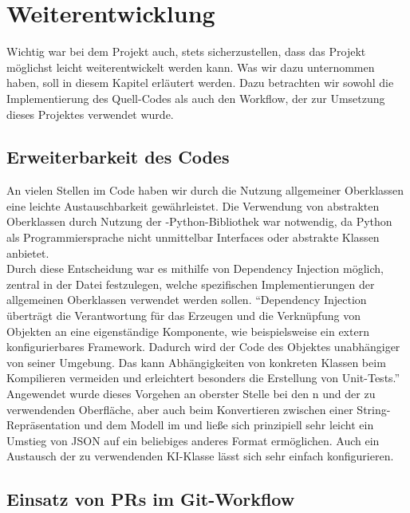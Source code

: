\chapter{Weiterentwicklung}
\label{ch:weiterentwicklung}

Wichtig war bei dem Projekt auch, stets sicherzustellen, dass das Projekt möglichst leicht weiterentwickelt werden kann.
Was wir dazu unternommen haben, soll in diesem Kapitel erläutert werden.
Dazu betrachten wir sowohl die Implementierung des Quell-Codes als auch den Workflow, der zur Umsetzung dieses Projektes
verwendet wurde.

\section{Erweiterbarkeit des Codes}
\label{sec:erweiterbarkeit}

An vielen Stellen im Code haben wir durch die Nutzung allgemeiner Oberklassen eine leichte Austauschbarkeit
gewährleistet.
Die Verwendung von abstrakten Oberklassen durch Nutzung der -Python-Bibliothek  war notwendig,
da Python als Programmiersprache nicht unmittelbar Interfaces oder abstrakte Klassen anbietet. \\

Durch diese Entscheidung war es mithilfe von Dependency Injection möglich, zentral in der Datei 
festzulegen, welche spezifischen Implementierungen der allgemeinen Oberklassen verwendet werden sollen.
"`Dependency Injection überträgt die Verantwortung für das Erzeugen und die Verknüpfung von Objekten an eine
eigenständige Komponente, wie beispielsweise ein extern konfigurierbares Framework.
Dadurch wird der Code des Objektes unabhängiger von seiner Umgebung.
Das kann Abhängigkeiten von konkreten Klassen beim Kompilieren vermeiden und erleichtert besonders die Erstellung von
Unit-Tests."' 
Angewendet wurde dieses Vorgehen an oberster Stelle bei den n und der zu verwendenden Oberfläche, aber
auch beim Konvertieren zwischen einer String-Repräsentation und dem Modell im  und 
ließe sich prinzipiell sehr leicht ein Umstieg von JSON auf ein beliebiges anderes Format ermöglichen.
Auch ein Austausch der zu verwendenden \ac{KI}-Klasse lässt sich sehr einfach konfigurieren.

\section{Einsatz von PRs im Git-Workflow}
\label{sec:git-workflow}

